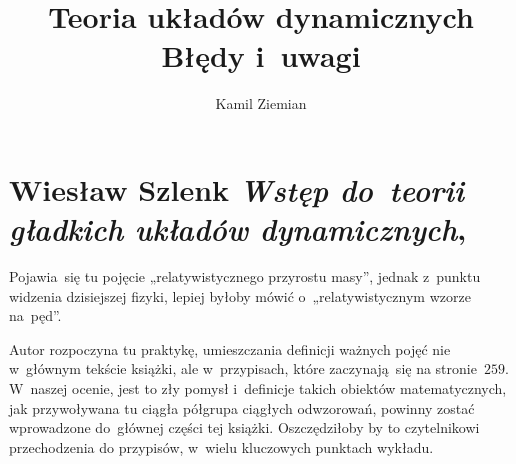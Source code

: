 \documentclass[a4paper,11pt]{article}
\title{Teoria układów dynamicznych \\
  {\Large Błędy i~uwagi}}
\author{Kamil Ziemian}
\numberwithin{equation}{section}
\begin{document}





\maketitle %





\section{Wiesław Szlenk \textit{Wstęp do~teorii gładkich układów dynamicznych},
  \parencite{Szlenk-Wstep-do-teorii-gladkich-ukladow-ETC-Pub-1982}}

\vspace{0em}















\noindent
{} Pojawia~się tu pojęcie „relatywistycznego przyrostu
masy”, jednak z~punktu widzenia dzisiejszej fizyki, lepiej byłoby mówić
o~„relatywistycznym wzorze na~pęd”.

\VerSpaceFour





\noindent
{} Autor rozpoczyna tu praktykę, umieszczania definicji
ważnych pojęć nie w~głównym tekście książki, ale w~przypisach, które
zaczynają~się na stronie~$259$. W~naszej ocenie, jest to zły pomysł
i~definicje takich obiektów matematycznych, jak przywoływana tu ciągła
półgrupa ciągłych odwzorowań, powinny zostać wprowadzone do~głównej części
tej książki. Oszczędziłoby by to czytelnikowi przechodzenia do przypisów,
w~wielu kluczowych punktach wykładu.
\end{document}
